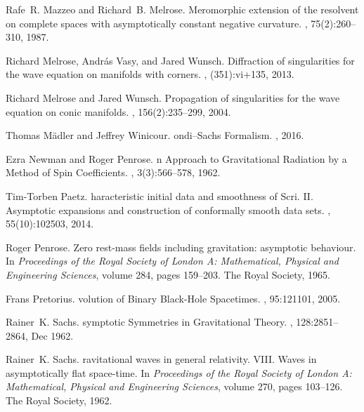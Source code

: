\documentclass[reqno,11pt,letterpaper]{amsart}
\numberwithin{equation}{section}
\numberwithin{figure}{section}
\theoremstyle{definition}
\theoremstyle{remark}
\begin{document}
\begin{thebibliography}{GCHMG05}
Rafe~R. Mazzeo and Richard~B. Melrose.
\newblock Meromorphic extension of the resolvent on complete spaces with
  asymptotically constant negative curvature.
, 75(2):260--310, 1987.

Richard Melrose, Andr\'as Vasy, and Jared Wunsch.
\newblock Diffraction of singularities for the wave equation on manifolds with
  corners.
, (351):vi+135, 2013.

Richard Melrose and Jared Wunsch.
\newblock Propagation of singularities for the wave equation on conic
  manifolds.
, 156(2):235--299, 2004.

Thomas M\"adler and Jeffrey Winicour.
ondi--{S}achs {F}ormalism.
, 2016.

Ezra Newman and Roger Penrose.
n {A}pproach to {G}ravitational {R}adiation by a {M}ethod of
  {S}pin {C}oefficients.
, 3(3):566--578, 1962.

Tim-Torben Paetz.
haracteristic initial data and smoothness of {S}cri. {I}{I}.
  {A}symptotic expansions and construction of conformally smooth data sets.
, 55(10):102503, 2014.

Roger Penrose.
\newblock Zero rest-mass fields including gravitation: asymptotic behaviour.
\newblock In {\em Proceedings of the Royal Society of London A: Mathematical,
  Physical and Engineering Sciences}, volume 284, pages 159--203. The Royal
  Society, 1965.

Frans Pretorius.
volution of {B}inary {B}lack-{H}ole {S}pacetimes.
, 95:121101, 2005.

Rainer~K. Sachs.
symptotic {S}ymmetries in {G}ravitational {T}heory.
, 128:2851--2864, Dec 1962.

Rainer~K. Sachs.
ravitational waves in general relativity. {V}{I}{I}{I}. {W}aves in
  asymptotically flat space-time.
\newblock In {\em Proceedings of the Royal Society of London A: Mathematical,
  Physical and Engineering Sciences}, volume 270, pages 103--126. The Royal
  Society, 1962.


\end{thebibliography}
\end{document}
